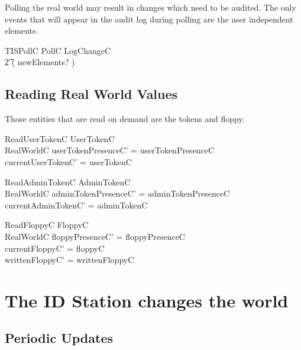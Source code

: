 Polling the real world may result in changes which need to be audited.
The only events that will appear in the audit log during polling are 
the user independent elements.

\begin{zed}
        TISPollC  PollC \land LogChangeC 
\\ \t2  \hide ( newElements? )
\end{zed}

\subsection{Reading Real World Values}

Those entities that are read on demand are the tokens and floppy.

\begin{schema}{ReadUserTokenC}
        \Delta UserTokenC
\\	RealWorldC
\where
	userTokenPresenceC' = userTokenPresenceC
\\	currentUserTokenC' = userTokenC
\end{schema}

\begin{schema}{ReadAdminTokenC}
	\Delta AdminTokenC
\\      RealWorldC
\where
	adminTokenPresenceC' = adminTokenPresenceC
\\	currentAdminTokenC' = adminTokenC
\end{schema}

\begin{schema}{ReadFloppyC}
        \Delta FloppyC
\\      RealWorldC
\where
	floppyPresenceC' = floppyPresenceC
\\      currentFloppyC' =  floppyC
\\      writtenFloppyC' = writtenFloppyC
\end{schema}

\section{The ID Station changes the world}


\subsection{Periodic Updates}

